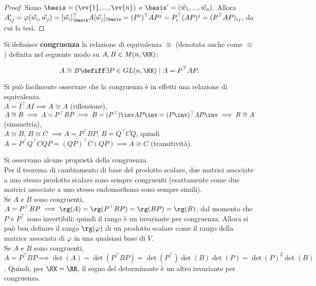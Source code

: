 \begin{proof} Siano $\basis = (\vv{1}, ..., \vv{n})$ e $\basis' = (\vec{w}_1, ..., \vec{w}_n)$. Allora
	$A'_{ij} = \varphi(\vec{w}_i, \vec{w}_j) = [\vec{w}_i]_{\basis}^\top A [\vec{w}_j]_{\basis} =
	(P^i)^\top A P^j = P_i^\top (AP)^j = (P^\top AP)_{ij}$, da cui la tesi.
\end{proof}

\begin{definition}
	Si definisce \textbf{congruenza} la relazione di equivalenza $\cong$ (denotata anche come $\equiv$) definita nel seguente
	modo su $A, B \in M(n, \KK)$:
	
	\[ A \cong B \defiff \exists P \in GL(n, \KK) \mid A = P^\top A P. \]
\end{definition}

\begin{remark}
	Si può facilmente osservare che la congruenza è in effetti una relazione di equivalenza. \\
	
	\li $A = I^\top A I \implies A \cong A$ (riflessione), \\
	\li $A \cong B \implies A = P^\top B P \implies B = (P^\top)\inv A P\inv = (P\inv)^\top A P\inv \implies B \cong A$ (simmetria), \\
	\li $A \cong B$, $B \cong C$ $\implies A = P^\top B P$, $B = Q^\top C Q$, quindi $A = P^\top Q^\top C Q P =
	(QP)^\top C (QP) \implies A \cong C$ (transitività). 
\end{remark}

\begin{remark}
	Si osservano alcune proprietà della congruenza. \\
	
	\li Per il teorema di cambiamento di base del prodotto scalare, due matrici associate a uno stesso
	prodotto scalare sono sempre congruenti (esattamente come due matrici associate a uno stesso
	endomorfismo sono sempre simili). \\
	\li Se $A$ e $B$ sono congruenti, $A = P^\top B P \implies \rg(A) = \rg(P^\top B P) = \rg(BP) = \rg(B)$,
	dal momento che $P$ e $P^\top$ sono invertibili; quindi il rango è un invariante per congruenza. Allora
	si può ben definire il rango $\rg(\varphi)$ di un prodotto scalare come il rango della matrice
	associata di $\varphi$ in una qualsiasi base di $V$. \\
	\li Se $A$ e $B$ sono congruenti, $A = P^\top B P \implies \det(A) = \det(P^\top B P) = \det(P^\top) \det(B) \det(P)=
	\det(P)^2 \det(B)$. Quindi, per $\KK = \RR$, il segno del determinante è un altro invariante per congruenza.
\end{remark}

